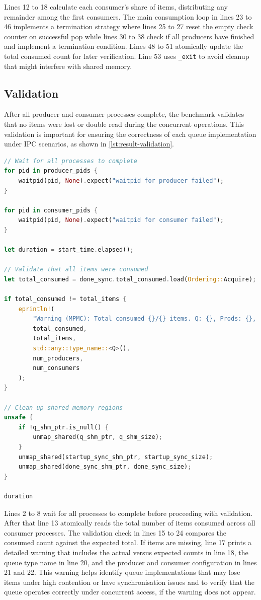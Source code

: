 Lines 12 to 18 calculate each consumer's share of items, distributing any remainder among the first consumers. The main consumption loop in lines 23 to 46 implements a termination strategy where lines 25 to 27 reset the empty check counter on successful pop while lines 30 to 38 check if all producers have finished and implement a termination condition. Lines 48 to 51 atomically update the total consumed count for later verification. Line 53 uses \texttt{\_exit} to avoid cleanup that might interfere with shared memory.

\subsection{Validation}
After all producer and consumer processes complete, the benchmark validates that no items were lost or double read during the concurrent operations. This validation is important for ensuring the correctness of each queue implementation under \ac{IPC} scenarios, as shown in \cref{lst:result-validation}.

\begin{lstlisting}[language=Rust, style=boxed, caption={Post-benchmark validation of results}, label={lst:result-validation}]
// Wait for all processes to complete
for pid in producer_pids {
    waitpid(pid, None).expect("waitpid for producer failed");
}

for pid in consumer_pids {
    waitpid(pid, None).expect("waitpid for consumer failed");
}

let duration = start_time.elapsed();

// Validate that all items were consumed
let total_consumed = done_sync.total_consumed.load(Ordering::Acquire);

if total_consumed != total_items {
    eprintln!(
        "Warning (MPMC): Total consumed {}/{} items. Q: {}, Prods: {}, Cons: {}",
        total_consumed,
        total_items,
        std::any::type_name::<Q>(),
        num_producers,
        num_consumers
    );
}

// Clean up shared memory regions
unsafe {
    if !q_shm_ptr.is_null() {
        unmap_shared(q_shm_ptr, q_shm_size);
    }
    unmap_shared(startup_sync_shm_ptr, startup_sync_size);
    unmap_shared(done_sync_shm_ptr, done_sync_size);
}

duration
\end{lstlisting}

Lines 2 to 8 wait for all processes to complete before proceeding with validation. After that line 13 atomically reads the total number of items consumed across all consumer processes. The validation check in lines 15 to 24 compares the consumed count against the expected total. If items are missing, line 17 prints a detailed warning that includes the actual versus expected counts in line 18, the queue type name in line 20, and the producer and consumer configuration in lines 21 and 22. This warning helps identify queue implementations that may lose items under high contention or have synchronisation issues and to verify that the queue operates correctly under concurrent access, if the warning does not appear.

